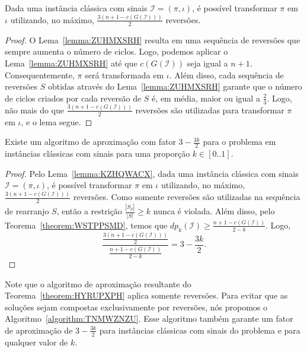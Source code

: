 

\begin{lemma}\label{lemma:KZHQWACX}
Dada uma instância clássica com sinais $\mathcal{I} = (\pi,\iota)$, é possível transformar $\pi$ em $\iota$ utilizando, no máximo, $\frac{3(n + 1 -c(G(\mathcal{I})))}{2}$ reversões.
\end{lemma}
\begin{proof}
O Lema~\ref{lemma:ZUHMXSRH} resulta em uma sequência de reversões que sempre aumenta o número de ciclos. Logo, podemos aplicar o Lema~\ref{lemma:ZUHMXSRH} até que $c(G(\mathcal{I}))$ seja igual a ${n+1}$. Consequentemente, $\pi$ será transformada em $\iota$. Além disso, cada sequência de reversões $S$ obtidas através do Lema~\ref{lemma:ZUHMXSRH} garante que o número de ciclos criados por cada reversão de $S$ é, em média, maior ou igual a $\frac{2}{3}$. Logo, não mais do que $\frac{3(n + 1 -c(G(\mathcal{I})))}{2}$ reversões são utilizadas para transformar $\pi$ em $\iota$, e o lema segue.
\end{proof}

\begin{theorem}\label{theorem:HYRUPXPH}
Existe um algoritmo de aproximação com fator $3-\frac{3k}{2}$ para o problema \SbPRT{} em instâncias clássicas com sinais para uma proporção $k \in [0..1]$.
\end{theorem}
\begin{proof}
Pelo Lema~\ref{lemma:KZHQWACX}, dada uma instância clássica com sinais $\mathcal{I} = (\pi,\iota)$, é possível transformar $\pi$ em $\iota$ utilizando, no máximo, $\frac{3(n + 1 -c(G(\mathcal{I})))}{2}$ reversões. Como somente reversões são utilizadas na sequência de rearranjo $S$, então a restrição $\frac{|S_{\rho}|}{|S|} \ge k$ nunca é violada. Além disso, pelo Teorema~\ref{theorem:WSTPPSMD}, temos que $dp_{k}(\mathcal{I}) \ge \frac{n + 1 - c(G(\mathcal{I}))}{2-k}$. Logo,
$$\frac{\frac{3(n + 1 - c(G(\mathcal{I})))}{2}}{\frac{n + 1 - c(G(\mathcal{I}))}{2-k}} = 3-\frac{3k}{2}.$$
\end{proof}


Note que o algoritmo de aproximação resultante do Teorema~\ref{theorem:HYRUPXPH} aplica somente reversões. Para evitar que as soluções sejam compostas exclusivamente por reversões, nós propomos o Algoritmo~\ref{algorithm:TNMWZNZU}. Esse algoritmo também garante um fator de aproximação de $3-\frac{3k}{2}$ para instâncias clássicas com sinais do problema \SbPRT{} e para qualquer valor de $k$.



